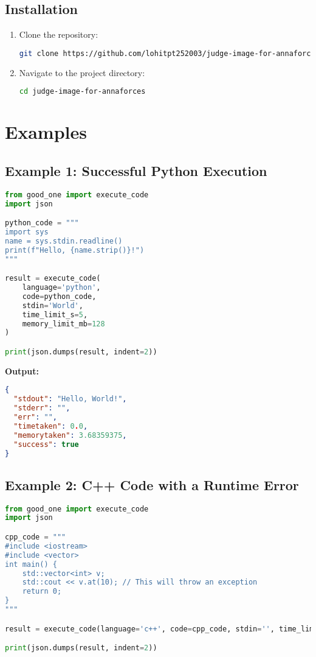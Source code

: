 \documentclass{article}
\begin{document}
\subsection{Installation}
\begin{enumerate}
    \item Clone the repository:
    \begin{lstlisting}[language=bash]
git clone https://github.com/lohitpt252003/judge-image-for-annaforces.git
    \end{lstlisting}
    \item Navigate to the project directory:
    \begin{lstlisting}[language=bash]
cd judge-image-for-annaforces
    \end{lstlisting}
\end{enumerate}

\section{Examples}

\subsection{Example 1: Successful Python Execution}
\begin{lstlisting}[language=Python]
from good_one import execute_code
import json

python_code = """
import sys
name = sys.stdin.readline()
print(f"Hello, {name.strip()}!")
"""

result = execute_code(
    language='python',
    code=python_code,
    stdin='World',
    time_limit_s=5,
    memory_limit_mb=128
)

print(json.dumps(result, indent=2))
\end{lstlisting}

\textbf{Output:}
\begin{lstlisting}[language=json]
{
  "stdout": "Hello, World!",
  "stderr": "",
  "err": "",
  "timetaken": 0.0,
  "memorytaken": 3.68359375,
  "success": true
}
\end{lstlisting}

\subsection{Example 2: C++ Code with a Runtime Error}
\begin{lstlisting}[language=Python]
from good_one import execute_code
import json

cpp_code = """
#include <iostream>
#include <vector>
int main() {
    std::vector<int> v;
    std::cout << v.at(10); // This will throw an exception
    return 0;
}
"""

result = execute_code(language='c++', code=cpp_code, stdin='', time_limit_s=5, memory_limit_mb=128)

print(json.dumps(result, indent=2))
\end{lstlisting}
\end{document}
